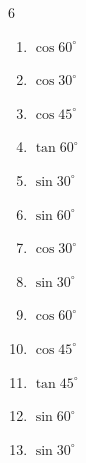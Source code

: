 \begin{multicols}{6}
\begin{enumerate}
\columnbreak %

  \item $\displaystyle \cos{60^\circ}$


  \item $\displaystyle \cos{30^\circ}$


  \item $\displaystyle \cos{45^\circ}$


  \item $\displaystyle \tan{60^\circ}$


  \item $\displaystyle \sin{30^\circ}$


  \item $\displaystyle \sin{60^\circ}$


  \item $\displaystyle \cos{30^\circ}$


  \item $\displaystyle \sin{30^\circ}$


  \item $\displaystyle \cos{60^\circ}$


  \item $\displaystyle \cos{45^\circ}$


  \item $\displaystyle \tan{45^\circ}$

        \phantom{$\displaystyle =1$}

  \item $\displaystyle \sin{60^\circ}$


  \item $\displaystyle \sin{30^\circ}$


\end{enumerate}
\end{multicols}
